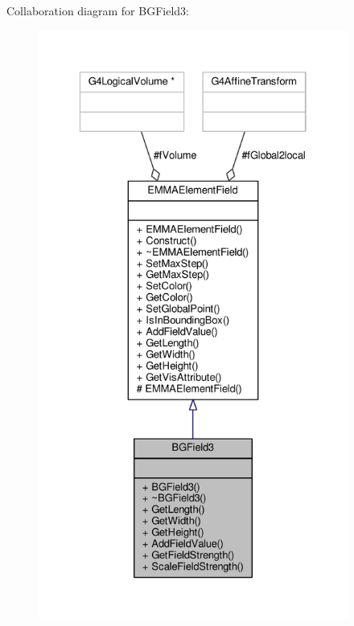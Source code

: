 Collaboration diagram for B\+G\+Field3\+:
\nopagebreak
\begin{figure}[H]
\begin{center}
\leavevmode
\includegraphics[height=550pt]{classBGField3__coll__graph}
\end{center}
\end{figure}

